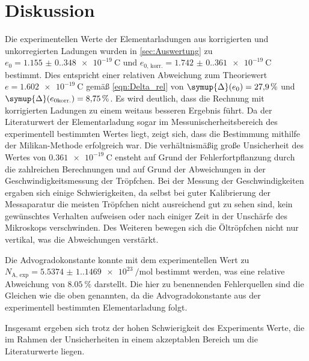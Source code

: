 \section{Diskussion}
\label{sec:Diskussion}
Die experimentellen Werte der Elementarladungen aus korrigierten und unkorregierten Ladungen wurden in \autoref{sec:Auswertung} zu 
$e_0 = \qty{1.155(0.348)e-19}{\coulomb}$ und $e_{0 \text{, korr.}} = \qty{1.742(0.361)e-19}{\coulomb}$ bestimmt. Dies entspricht einer
relativen Abweichung zum Theoriewert $e = \qty{1.602e-19}{\coulomb}$ \cite{Ingenieurwissen} gemäß \autoref{eqn:Delta_rel} von $\symup{\Delta}(e_0) = \qty{27.9}{\percent}$ und 
$\symup{\Delta}(e_{0 \text{korr.}}) = \qty{8.75}{\percent}$. Es wird deutlich, dass die Rechnung mit korrigierten Ladungen zu einem weitaus besseren Ergebnis führt. 
Da der Literaturwert der Elementarladung sogar im Messunischerheitsbereich des experimentell bestimmten Wertes liegt, zeigt sich, dass die Bestimmung mithilfe der 
Milikan-Methode erfolgreich war. Die verhältnismäßig große Unsicherheit des Wertes von $\qty{0.361e-19}{\coulomb}$ ensteht auf Grund der Fehlerfortpflanzung durch
die zahlreichen Berechnungen und auf Grund der Abweichungen in der Geschwindigkeitsmessung der Tröpfchen. Bei der Messung der Geschwindigkeiten ergaben sich einige
Schwierigkeiten, da selbst bei guter Kalibrierung der Messaparatur die meisten Tröpfchen nicht ausreichend gut zu sehen sind, kein gewünschtes Verhalten aufweisen 
oder nach einiger Zeit in der Unschärfe des Mikroskops verschwinden. Des Weiteren bewegen sich die Öltröpfchen nicht nur vertikal, was die Abweichungen verstärkt.

Die Advogradokonstante konnte mit dem experimentellen Wert zu $N_\text{A, exp} = \qty{5.5374(1.1469)e23}{\per\mol}$ bestimmt werden, was eine relative Abweichung
von $\qty{8.05}{\percent}$ darstellt. Die hier zu benennenden Fehlerquellen sind die Gleichen wie die oben genannten, da die Advogradokonstante aus der
experimentell bestimmten Elementarladung folgt.

Insgesamt ergeben sich trotz der hohen Schwierigkeit des Experiments Werte, die im Rahmen der Unsicherheiten in einem akzeptablen Bereich um die Literaturwerte
liegen.
